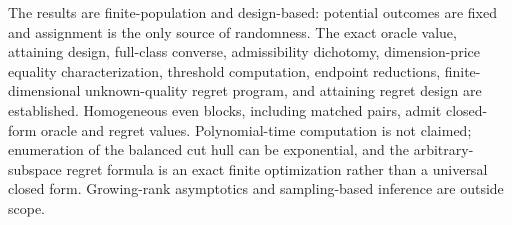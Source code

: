 The results are finite-population and design-based: potential outcomes are fixed and assignment is the only source of randomness. The exact oracle value, attaining design, full-class converse, admissibility dichotomy, dimension-price equality characterization, threshold computation, endpoint reductions, finite-dimensional unknown-quality regret program, and attaining regret design are established. Homogeneous even blocks, including matched pairs, admit closed-form oracle and regret values. Polynomial-time computation is not claimed; enumeration of the balanced cut hull can be exponential, and the arbitrary-subspace regret formula is an exact finite optimization rather than a universal closed form. Growing-rank asymptotics and sampling-based inference are outside scope.
